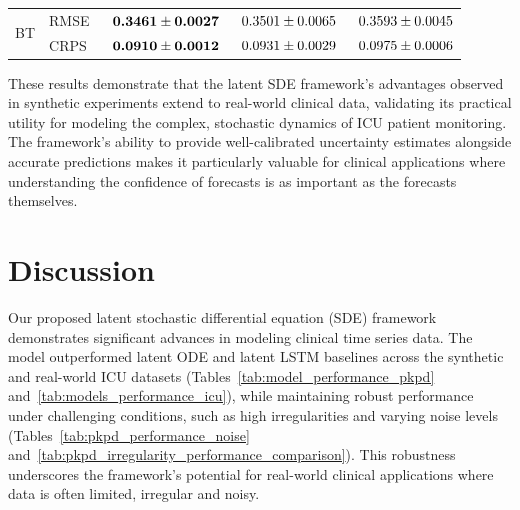 \documentclass[preprint,12pt]{elsarticle}
\begin{document}
\begin{table}[ht]
\begin{small}
\begin{tabular}{l l c c c}
\midrule
\multirow{2}{*}{BT} & RMSE &$ \textbf{\hspace{\widthof{1}}0.3461}  \pm \textbf{0.0027} $ & $\hspace{\widthof{1}}0.3501 \pm 0.0065$ & $\hspace{\widthof{1}}0.3593 \pm   0.0045$\\
                    & CRPS &$\textbf{\hspace{\widthof{1}}0.0910} \pm \textbf{0.0012}$  & $\hspace{\widthof{1}}0.0931 \pm 0.0029$ &$\hspace{\widthof{1}}0.0975 \pm 0.0006$  \\                  
\bottomrule
\end{tabular}
\end{small}
\end{table}
These results demonstrate that the latent SDE framework's advantages observed in synthetic experiments extend to real-world clinical data, validating its practical utility for modeling the complex, stochastic dynamics of ICU patient monitoring. The framework's ability to provide well-calibrated uncertainty estimates alongside accurate predictions makes it particularly valuable for clinical applications where understanding the confidence of forecasts is as important as the forecasts themselves.

\section{Discussion}
Our proposed latent stochastic differential equation (SDE) framework demonstrates significant advances in modeling clinical time series data. The model outperformed latent ODE and latent LSTM baselines across the synthetic and real-world ICU datasets (Tables~\ref{tab:model_performance_pkpd} and~\ref{tab:models_performance_icu}), while maintaining robust performance under challenging conditions, such as high irregularities and  varying noise levels (Tables~\ref{tab:pkpd_performance_noise} and~\ref{tab:pkpd_irregularity_performance_comparison}). This robustness underscores the framework’s potential for real-world clinical applications where data is often limited, irregular and noisy.
\end{document}
